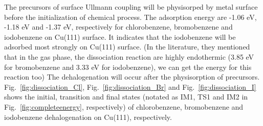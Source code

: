 \documentclass[%
 reprint,
 amsmath,amssymb,
 aps,
prb,
]{revtex4-2}
\begin{document}
The precursors of surface Ullmann coupling will be physisorped by metal surface before the initialization of chemical process. The adsorption energy are -1.06 eV, -1.18 eV and -1.37 eV, respectively for chlorobenzene, bromobenzene and iodobenzene on Cu(111) surface. It indicates that the iodobenzene will be adsorbed most strongly on Cu(111) surface.
(In the literature, they mentioned that in the gas phase, the dissociation reaction are highly endothermic (3.85 eV for bromobenzene and 3.33 eV for iodobenzene), we can get the energy for this reaction too)
The dehalogenation will occur after the physisorption of precursors. Fig.~\ref{fig:dissociation_Cl}, Fig.~\ref{fig:dissociation_Br} and Fig.~\ref{fig:dissociation_I} shows the initial, transition and final states (notated as IM1, TS1 and IM2 in Fig.~\ref{fig:completeenergy}, respectively) of chlorobenzene, bromobenzene and iodobenzene dehalogenation on Cu(111), respectively. 
\end{document}
